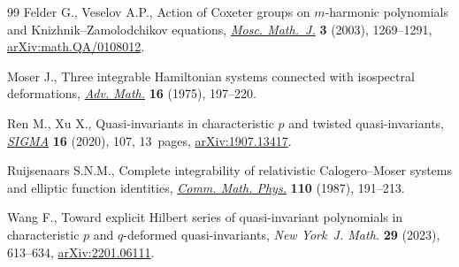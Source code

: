 \documentclass[pdftex]{sigma}
\theoremstyle{definition}
\numberwithin{equation}{section}
\begin{document}
\begin{thebibliography}{99}
Felder G., Veselov A.P., Action of {C}oxeter groups on {$m$}-harmonic
 polynomials and {K}nizhnik--{Z}amolodchikov equations,
 \href{https://doi.org/10.17323/1609-4514-2003-3-4-1269-1291}{\textit{Mosc.
 Math.~J.}} \textbf{3} (2003), 1269--1291,
 \href{http://arxiv.org/abs/math.QA/0108012}{arXiv:math.QA/0108012}.

Moser J., Three integrable {H}amiltonian systems connected with isospectral
 deformations,
 \href{https://doi.org/10.1016/0001-8708(75)90151-6}{\textit{Adv. Math.}}
 \textbf{16} (1975), 197--220.

Ren M., Xu X., Quasi-invariants in characteristic {$p$} and twisted
 quasi-invariants,
 \href{https://doi.org/10.3842/SIGMA.2020.107}{\textit{SIGMA}} \textbf{16}
 (2020), 107, 13~pages,
 \href{http://arxiv.org/abs/1907.13417}{arXiv:1907.13417}.

Ruijsenaars S.N.M., Complete integrability of relativistic {C}alogero--{M}oser
 systems and elliptic function identities,
 \href{https://doi.org/10.1007/BF01207363}{\textit{Comm. Math. Phys.}}
 \textbf{110} (1987), 191--213.

Wang F., Toward explicit {H}ilbert series of quasi-invariant polynomials in
 characteristic {$p$} and {$q$}-deformed quasi-invariants, \textit{New York~J.
 Math.} \textbf{29} (2023), 613--634,
 \href{http://arxiv.org/abs/2201.06111}{arXiv:2201.06111}.

\end{thebibliography}\LastPageEnding
\end{document}
